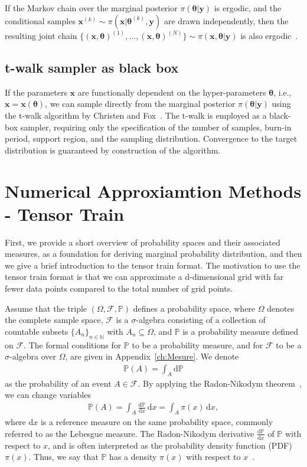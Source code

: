 If the Markov chain over the marginal posterior $\pi(\bm{\theta} |  \bm{y})$ is ergodic, and the conditional samples $\bm{x}^{(k)} \sim \pi(\bm{x}|   \bm{\theta}^{(k)}, \bm{y})$ are drawn independently, then the resulting joint chain $\{ (\bm{x}, \bm{\theta})^{(1)}, \dots, (\bm{x}, \bm{\theta})^{(N)} \} \sim \pi(\bm{x}, \bm{\theta} |  \bm{y})$ is also ergodic~\cite{acosta2014markov}.

\subsection{t-walk sampler as black box}
If the parameters $\bm{x}$ are functionally dependent on the hyper-parameters $\bm{\theta}$, i.e., $\bm{x} = \bm{x}(\bm{\theta})$, we can sample directly from the marginal posterior $\pi(\bm{\theta} | \bm{y})$ using the t-walk algorithm by Christen and Fox~\cite{christen2010general}. 
The t-walk is employed as a black-box sampler, requiring only the specification of the number of samples, burn-in period, support region, and the sampling distribution. 
Convergence to the target distribution is guaranteed by construction of the algorithm.

\section{Numerical Approxiamtion Methods - Tensor Train}
\label{sec:tensortrain}
First, we provide a short overview of probability spaces and their associated measures, as a foundation for deriving marginal probability distribution, and then we give a brief introduction to the tensor train format.
The motivation to use the tensor train format is that we can approximate a d-dimensional grid with far fewer data points compared to the total number of grid points.

Assume that the triple $(\Omega, \mathcal{F}, \mathbb{P})$ defines a probability space, where $\Omega$ denotes the complete sample space, $\mathcal{F}$ is a $\sigma$-algebra consisting of a collection of countable subsets $\{A_n\}_{n \in \mathbb{N}}$ with $A_n \subseteq \Omega$, and $\mathbb{P}$ is a probability measure defined on $\mathcal{F}$. The formal conditions for $\mathbb{P}$ to be a probability measure, and for $\mathcal{F}$ to be a $\sigma$-algebra over $\Omega$, are given in Appendix~\ref{ch:Mesure}.
We denote
\begin{align}
	\mathbb{P}(A) = \int_A \mathrm{d} \mathbb{P}
\end{align}
as the probability of an event $A \in \mathcal{F}$.
By applying the Radon-Nikodym theorem~\cite{kopp2004measintprob}, we can change variables
\begin{align}
	\mathbb{P}(A) = \int_A \frac{\mathrm{d} \mathbb{P}}{\mathrm{d}x} \, \mathrm{d}x = \int_A \pi(x) \, \mathrm{d}x,
\end{align}
where $\mathrm{d}x$ is a reference measure on the same probability space, commonly referred to as the Lebesgue measure. 
The Radon-Nikodym derivative $\frac{\mathrm{d} \mathbb{P}}{\mathrm{d}x}$ of $\mathbb{P}$ with respect to $x$, and is often interpreted as the probability density function (PDF) $\pi(x)$. Thus, we say that $\mathbb{P}$ has a density $\pi(x)$ with respect to $x$~\cite[Chapter 10]{simonnet1996measprob}.

